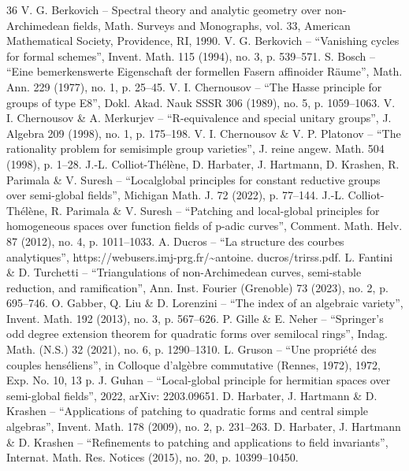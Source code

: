 \documentclass[10pt]{amsart}
\theoremstyle{definition}
\begin{document}
\begin{thebibliography}{36}
 V. G. Berkovich – Spectral theory and analytic geometry over non-Archimedean fields, Math. Surveys and Monographs, vol. 33, American Mathematical Society, Providence, RI, 1990.
 V. G. Berkovich – “Vanishing cycles for formal schemes”, Invent. Math. 115 (1994), no. 3, p. 539–571.
 S. Bosch – “Eine bemerkenswerte Eigenschaft der formellen Fasern affinoider Räume”, Math. Ann. 229 (1977), no. 1, p. 25–45.
 V. I. Chernousov – “The Hasse principle for groups of type E8”, Dokl. Akad. Nauk SSSR 306 (1989), no. 5, p. 1059–1063.
 V. I. Chernousov \& A. Merkurjev – “R-equivalence and special unitary groups”, J. Algebra 209 (1998), no. 1, p. 175–198.
 V. I. Chernousov \& V. P. Platonov – “The rationality problem for semisimple group varieties”, J. reine angew. Math. 504 (1998), p. 1–28.
 J.-L. Colliot-Thélène, D. Harbater, J. Hartmann, D. Krashen, R. Parimala \& V. Suresh – “Localglobal principles for constant reductive groups over semi-global fields”, Michigan Math. J. 72 (2022), p. 77–144.
 J.-L. Colliot-Thélène, R. Parimala \& V. Suresh – “Patching and local-global principles for homogeneous spaces over function fields of p-adic curves”, Comment. Math. Helv. 87 (2012), no. 4, p. 1011–1033.
 A. Ducros – “La structure des courbes analytiques”, https://webusers.imj-prg.fr/\textasciitilde{}antoine. ducros/trirss.pdf.
 L. Fantini \& D. Turchetti – “Triangulations of non-Archimedean curves, semi-stable reduction, and ramification”, Ann. Inst. Fourier (Grenoble) 73 (2023), no. 2, p. 695–746.
 O. Gabber, Q. Liu \& D. Lorenzini – “The index of an algebraic variety”, Invent. Math. 192 (2013), no. 3, p. 567–626.
 P. Gille \& E. Neher – “Springer’s odd degree extension theorem for quadratic forms over semilocal rings”, Indag. Math. (N.S.) 32 (2021), no. 6, p. 1290–1310.
 L. Gruson – “Une propriété des couples henséliens”, in Colloque d’algèbre commutative (Rennes, 1972), 1972, Exp. No. 10, 13 p.
 J. Guhan – “Local-global principle for hermitian spaces over semi-global fields”, 2022, arXiv: 2203.09651.
 D. Harbater, J. Hartmann \& D. Krashen – “Applications of patching to quadratic forms and central simple algebras”, Invent. Math. 178 (2009), no. 2, p. 231–263.
 D. Harbater, J. Hartmann \& D. Krashen – “Refinements to patching and applications to field invariants”, Internat. Math. Res. Notices (2015), no. 20, p. 10399–10450.

\end{thebibliography}
\end{document}
